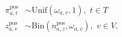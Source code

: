 \begin{align}
  \pi_{a, t}^{\text{pos}} &\sim \text{Unif}(\omega_{a, v}, 1), \,\, t \in T
  \label{eqn:pipos-unif-model-one} \\
  z_{a, v}^{\text{pos}} &\sim \text{Bin}(n_{a, z}^{\text{pos}}, \omega_{a, v})
  \label{eqn:pipos-unif-model-two}, \,\, v \in V,\
\end{align}